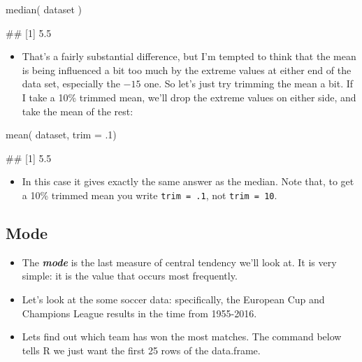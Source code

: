 \documentclass[
]{book}
\newenvironment{Shaded}{\begin{snugshade}}{\end{snugshade}}
\newcommand{\AttributeTok}[1]{\textcolor[rgb]{0.77,0.63,0.00}{#1}}
\newcommand{\DecValTok}[1]{\textcolor[rgb]{0.00,0.00,0.81}{#1}}
\newcommand{\FunctionTok}[1]{\textcolor[rgb]{0.00,0.00,0.00}{#1}}
\newcommand{\NormalTok}[1]{#1}
\providecommand{\tightlist}{%
  \setlength{\itemsep}{0pt}\setlength{\parskip}{0pt}}
\begin{document}
\begin{Shaded}
\begin{Highlighting}[]
\FunctionTok{median}\NormalTok{( dataset )}
\end{Highlighting}
\end{Shaded}

\begin{Shaded}
\begin{Highlighting}[]
\NormalTok{\#\# [1] 5.5}
\end{Highlighting}
\end{Shaded}

\begin{itemize}
\tightlist
\item
  That's a fairly substantial difference, but I'm tempted to think that the mean is being influenced a bit too much by the extreme values at either end of the data set, especially the \(-15\) one. So let's just try trimming the mean a bit. If I take a 10\% trimmed mean, we'll drop the extreme values on either side, and take the mean of the rest:
\end{itemize}

\begin{Shaded}
\begin{Highlighting}[]
\FunctionTok{mean}\NormalTok{( dataset, }\AttributeTok{trim =}\NormalTok{ .}\DecValTok{1}\NormalTok{)}
\end{Highlighting}
\end{Shaded}

\begin{Shaded}
\begin{Highlighting}[]
\NormalTok{\#\# [1] 5.5}
\end{Highlighting}
\end{Shaded}

\begin{itemize}
\tightlist
\item
  In this case it gives exactly the same answer as the median. Note that, to get a 10\% trimmed mean you write \texttt{trim\ =\ .1}, not \texttt{trim\ =\ 10}.
\end{itemize}

\hypertarget{mode}{%
\subsection{Mode}\label{mode}}

\begin{itemize}
\item
  The \textbf{\emph{mode}} is the last measure of central tendency we'll look at. It is very simple: it is the value that occurs most frequently.
\item
  Let's look at the some soccer data: specifically, the European Cup and Champions League results in the time from 1955-2016.
\item
  Lets find out which team has won the most matches. The command below tells R we just want the first 25 rows of the data.frame.
\end{itemize}
\end{document}
